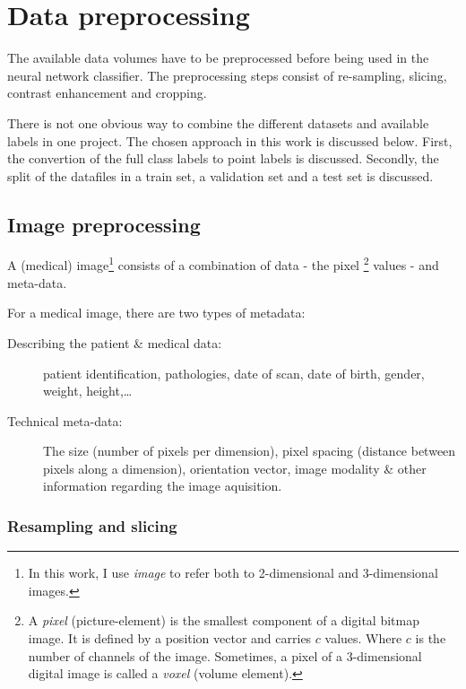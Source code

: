 \chapter{Data preprocessing}

The available data volumes have to be preprocessed before being used in the neural network classifier.
The preprocessing steps consist of re-sampling, slicing, contrast enhancement and cropping.  

There is not one obvious way to combine the different datasets and available labels in one project.
The chosen approach in this work is discussed below.
First, the convertion of the full class labels to point labels is discussed. 
Secondly, the split of the datafiles in a train set, a validation set and a test set is discussed.

\section{Image preprocessing}

A (medical) image\footnote{In this work, I use \textit{image} to refer both to 2-dimensional and 3-dimensional images.} consists of a combination of data - the pixel
\footnote{A \textit{pixel} (picture-element) is the smallest component of a digital bitmap image. 
It is defined by a position vector and carries $c$ values. Where $c$ is the number of channels of the image. 
Sometimes, a pixel of a 3-dimensional digital image is called a \textit{voxel} (volume element).} 
values - and meta-data.

For a medical image, there are two types of metadata:
\begin{description}
    \item [Describing the patient \& medical data:] patient identification, pathologies, date of scan, date of birth, gender, weight, height,\dots
    \item [Technical meta-data:] The size (number of pixels per dimension), pixel spacing (distance between pixels along a dimension), orientation vector, image modality \& other information regarding the image aquisition.
\end{description}

\subsection{Resampling and slicing\label{sec:resampling}}

